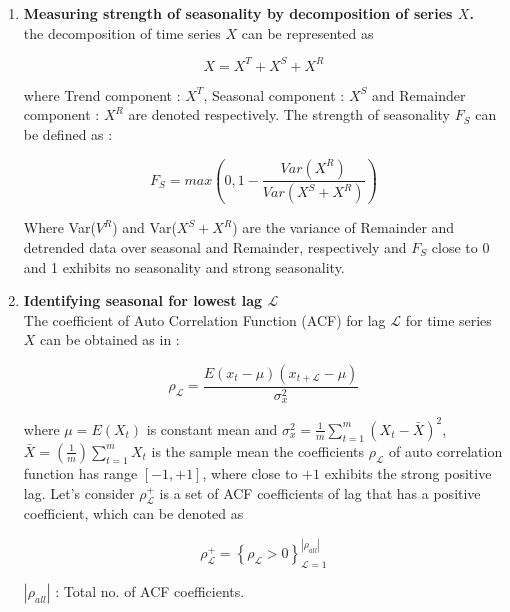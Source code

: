 \documentclass[a4paper, fleqn]{cas-sc}
\theoremstyle{definition}
\theoremstyle{remark}
\begin{document}
\begin{enumerate}[label=(\alph*)]

\item \textbf{Measuring strength of seasonality by decomposition of series $X$.}\\
the decomposition of time series $X$ can be represented  as 

\begin{equation}
  \label{x}
  X = X^T + X^S +X^R
\end{equation}

where Trend component : $X^T$,  Seasonal component :  $X^S$ and Remainder component :  $X^R$ are denoted respectively. 
The strength of seasonality $F_S$ can be defined as : 

\begin{equation}\label{fs}
  F_S=max \left(0, 1- \frac{Var (X^R)}{Var(X^S + X^R)} \right)
\end{equation}

Where Var($V^R$) and Var($X^S + X^R$) are the variance of Remainder and detrended data over seasonal and Remainder, respectively and $F_S$ close to 0 and 1 exhibits no seasonality and strong seasonality.

\item \textbf{Identifying seasonal for lowest lag $\mathscr{L}$} \\
The coefficient of Auto Correlation Function (ACF) for lag $\mathscr{L}$ for time series $X$ can be obtained as in : 

\begin{equation}
  \label{rovh}
  \rho_{\mathscr{L}}=\frac{E(x_t - \mu)(x_{t+ \mathscr{L}}-\mu)}{\sigma_x^2}
\end{equation}

where $\mu=E(X_t)$ is constant mean and $\sigma_x^2 = \frac{1}{m} \sum_{t=1}^{m} (X_t - \bar{X} )^2$,  $\bar{X}= \left(\frac{1}{m} \right) \sum_{t=1}^{m} X_t$ is the sample mean the coefficients $\rho_\mathscr{L}$ of auto correlation function has range $[-1,  +1]$,  where close to $+1$ exhibits the strong positive lag. Let's consider $\rho_\mathscr{L}^+$ is a set of ACF coefficients of lag that has a positive coefficient,  which can be denoted as

\begin{equation}\label{rhl}
  \rho_\mathscr{L}^+ ={\left\{ \rho_\mathscr{L} > 0 \right\}}_{\mathscr{L}=1}^{\left| \rho_{all}  \right|}
\end{equation} 

$\left|\rho_{all}  \right|$ :  Total no. of ACF coefficients.\\



\end{enumerate}
\end{document}
